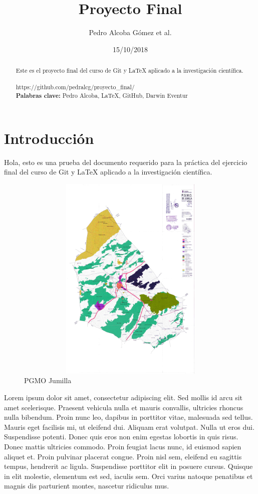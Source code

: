 \documentclass[a4paper,11pt]{article}
\begin{document}
\title{Proyecto Final}
\author{Pedro Alcoba Gómez et al.}
\date{15/10/2018}
\begin{abstract}
	Este es el proyecto final del curso de Git y \LaTeX{} aplicado a la investigación científica.
	\\\\
	https://github.com/pedralcg/proyecto\_final/
	\\
\textbf{Palabras clave:} Pedro Alcoba, \LaTeX{}, GitHub, Darwin Eventur  
\end{abstract}
\tableofcontents
\maketitle

\part{Introducción}
Hola, esto es una prueba del documento requerido para la práctica del ejercicio final del curso de Git y \LaTeX{} aplicado a la investigación científica.
\begin{figure}[h]
	\centering
		\includegraphics[width=150mm,height=100mm]{figura}
	\caption{PGMO Jumilla}
	\label{Figura}
\end{figure}

Lorem ipsum \cite{Bib01}dolor sit amet, consectetur adipiscing elit. Sed mollis id arcu sit amet scelerisque. Praesent vehicula nulla et mauris convallis, ultricies rhoncus nulla bibendum. Proin nunc leo, dapibus in porttitor vitae, malesuada sed tellus. Mauris eget facilisis mi, ut eleifend dui. Aliquam erat volutpat. Nulla ut eros dui. Suspendisse potenti. Donec quis eros non enim egestas lobortis in quis risus. Donec mattis ultricies commodo. Proin feugiat lacus nunc, id euismod sapien aliquet et. Proin pulvinar placerat congue. Proin nisl sem, eleifend eu sagittis tempus, hendrerit ac ligula. Suspendisse porttitor elit in posuere cursus. Quisque in elit molestie, elementum est sed, iaculis sem. Orci varius natoque penatibus et magnis dis parturient montes, nascetur ridiculus mus.
\end{document}
